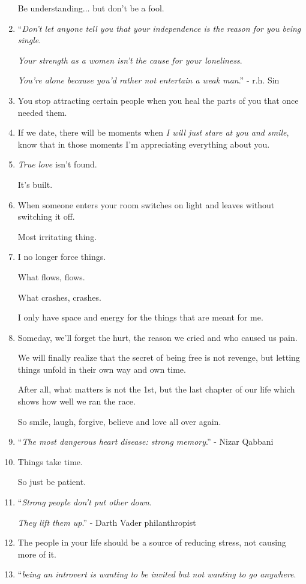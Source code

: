 \documentclass{article}
\begin{document}
\begin{enumerate}
	Be understanding$\ldots$ but don't be a fool.
	\item ``\textit{Don't let anyone tell you that your independence is the reason for you being single}.
	
	\textit{Your strength as a women isn't the cause for your loneliness}.
	
	\textit{You're alone because you'd rather not entertain a weak man}.'' - r.h. Sin
	\item You stop attracting certain people when you heal the parts of you that once needed them.
	\item If we date, there will be moments when \textit{I will just stare at you and smile}, know that in those moments I'm appreciating everything about you.
	\item \textit{True love} isn't found.
	
	It's built.
	\item When someone enters your room switches on light and leaves without switching it off.
	
	Most irritating thing.
	\item I no longer force things.
	
	What flows, flows.
	
	What crashes, crashes.
	
	I only have space and energy for the things that are meant for me.
	\item Someday, we'll forget the hurt, the reason we cried and who caused us pain.
	
	We will finally realize that the secret of being free is not revenge, but letting things unfold in their own way and own time.
	
	After all, what matters is not the 1st, but the last chapter of our life which shows how well we ran the race.
	
	So smile, laugh, forgive, believe and love all over again.
	\item ``\textit{The most dangerous heart disease: strong memory}.'' - Nizar Qabbani
	\item Things take time.
	
	So just be patient.
	\item ``\textit{Strong people don't put other down}.
	
	\textit{They lift them up}.'' - Darth Vader philanthropist
	\item The people in your life should be a source of reducing stress, not causing more of it.
	\item ``\textit{being an introvert is wanting to be invited but not wanting to go anywhere}.
	

\end{enumerate}
\end{document}
